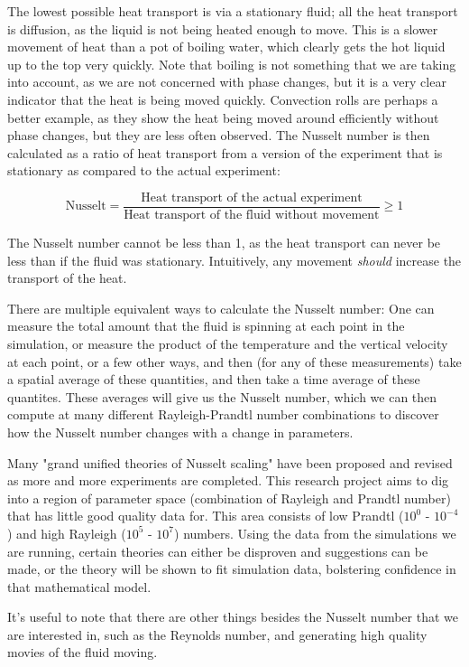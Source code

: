 \documentclass[12pt,a4paper]{report}
\begin{document}
	The lowest possible heat transport is via a stationary fluid; all the heat transport is diffusion, as the liquid is not being heated enough to move. This is a slower movement of heat than a pot of boiling water, which clearly gets the hot liquid up to the top very quickly. Note that boiling is not something that we are taking into account, as we are not concerned with phase changes, but it is a very clear indicator that the heat is being moved quickly. Convection rolls are perhaps a better example, as they show the heat being moved around efficiently without phase changes, but they are less often observed. The Nusselt number is then calculated as a ratio of heat transport from a version of the experiment that is stationary as compared to the actual experiment:

	$$\text{Nusselt} = \frac{\text{Heat transport of the actual experiment}}{\text{Heat transport of the fluid without movement}} \geq 1$$

	The Nusselt number cannot be less than 1, as the heat transport can never be less than if the fluid was stationary. Intuitively, any movement \textit{should} increase the transport of the heat.

	There are multiple equivalent ways to calculate the Nusselt number: One can measure the total amount that the fluid is spinning at each point in the simulation, or measure the product of the temperature and the vertical velocity at each point, or a few other ways, and then (for any of these measurements) take a spatial average of these quantities, and then take a time average of these quantites. These averages will give us the Nusselt number, which we can then compute at many different Rayleigh-Prandtl number combinations to discover how the Nusselt number changes with a change in parameters.

	Many "grand unified theories of Nusselt scaling" have been proposed and revised as more and more experiments are completed. This research project aims to dig into a region of parameter space (combination of Rayleigh and Prandtl number) that has little good quality data for. This area consists of low Prandtl ($10^0$ - $10^{-4}$) and high Rayleigh ($10^5$ - $10^7$) numbers. Using the data from the simulations we are running, certain theories can either be disproven and suggestions can be made, or the theory will be shown to fit simulation data, bolstering confidence in that mathematical model.

	It's useful to note that there are other things besides the Nusselt number that we are interested in, such as the Reynolds number, and generating high quality movies of the fluid moving.
\end{document}
